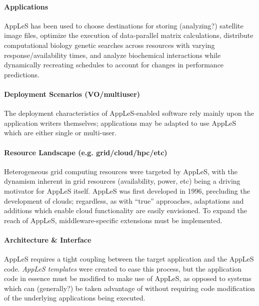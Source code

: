 \documentclass{sig-alternate}
\begin{document}
\paragraph{Applications}
AppLeS has been used to choose destinations
for storing (analyzing?)
satellite image files, optimize the execution of data-parallel matrix
calculations, distribute computational biology genetic searches
across resources with varying response/availability times, and
analyze biochemical interactions while dynamically recreating
schedules to account for changes in performance predictions.

\paragraph{Deployment Scenarios (VO/multiuser)}
The deployment characteristics of AppLeS-enabled software rely
mainly upon the application writers themselves; applications
may be adapted to use AppLeS which are either single or multi-user.

\paragraph{Resource Landscape (e.g. grid/cloud/hpc/etc)}
Heterogeneous grid computing resources were targeted by
AppLeS, with the dynamism inherent in grid resources (availability,
power, etc) being a driving motivator for AppLeS itself.  AppLeS
was first developed in 1996, precluding the development of clouds;
regardless, as with ``true'' \pilotjob approaches, adaptations
and additions which enable cloud functionality are easily
envisioned.  
 To expand the reach of AppLeS, middleware-specific
extensions must be implemented. 

\paragraph{Architecture \& Interface}
AppLeS requires a tight coupling between the target application
and the AppLeS code.  \textit{AppLeS templates} were created
to ease this process, but the application code in essence must
be modified to make use of AppLeS, as opposed to \pilotjob
systems which can (generally?) be taken advantage of without
requiring code modification of the underlying applications being
executed.
\end{document}
